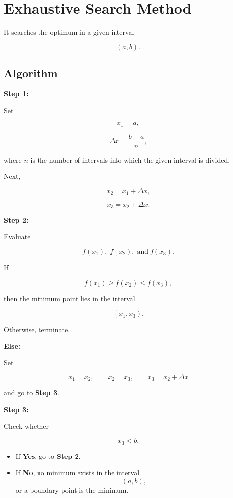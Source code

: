 \documentclass{article}
\begin{document}
\hrulefill

\section*{Exhaustive Search Method}

It searches the optimum in a given interval

\[
(a,b).
\]

\subsection*{Algorithm}

\textbf{Step 1:}

Set

\[
x_1=a,
\]

\[
\Delta x=\frac{b-a}{n},
\]

where \(n\) is the number of intervals into which the given interval is divided.

Next,

\[
x_2=x_1+\Delta x,
\]

\[
x_3=x_2+\Delta x.
\]

\textbf{Step 2:}

Evaluate

\[
f(x_1),\;f(x_2),\;\text{and}\;f(x_3).
\]

If

\[
f(x_1)\geq f(x_2)\leq f(x_3),
\]

then the minimum point lies in the interval

\[
(x_1,x_3).
\]

Otherwise, terminate.


\textbf{Else:}

Set

\[
x_1=x_2,\qquad
x_2=x_3,\qquad
x_3=x_2+\Delta x
\]

and go to \textbf{Step 3}.

\bigskip

\textbf{Step 3:}

Check whether

\[
x_3<b.
\]

\begin{itemize}
    \item If \textbf{Yes}, go to \textbf{Step 2}.
    \item If \textbf{No}, no minimum exists in the interval
    \[
    (a,b),
    \]
    or a boundary point is the minimum.
\end{itemize}

\hrulefill
\end{document}
